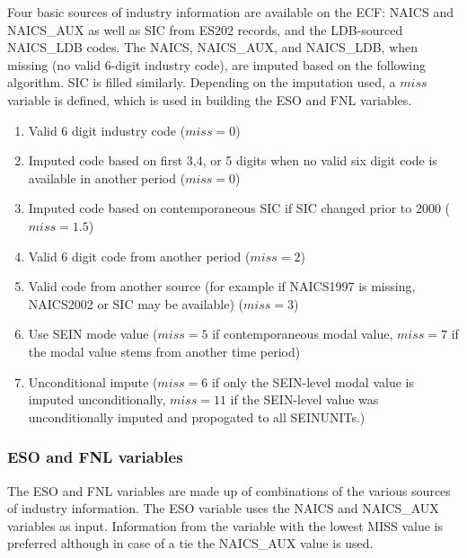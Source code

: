Four basic sources of industry information are available on the ECF: NAICS
and NAICS{\_}AUX as well as SIC from ES202 records, and the LDB-sourced
NAICS{\_}LDB codes. The NAICS, NAICS{\_}AUX, and 
NAICS{\_}LDB, when missing (no valid 6-digit industry code), are imputed based on the  following
algorithm. SIC is filled similarly. Depending on the imputation used, a
$miss$ variable is defined, which is used in building the ESO and FNL variables.


\begin{enumerate}
\item Valid 6 digit industry code ($miss=0$)

\item Imputed code based on first 3,4, or 5 digits when no valid six digit code is 
available in another period ($miss=0$)

\item Imputed code based on contemporaneous SIC if SIC changed prior to 2000 
($miss=1.5$)

\item Valid 6 digit code from another period ($miss=2$)

\item Valid code from another source (for example if NAICS1997 is missing, 
NAICS2002 or SIC may be available) ($miss=3$)

\item Use SEIN mode value ($miss=5$ if contemporaneous modal value, $miss=7$ if
  the modal value stems from another time period)

\item Unconditional impute ($miss=6$ if only the SEIN-level modal value is
  imputed unconditionally, $miss=11$ if the SEIN-level value was
  unconditionally imputed and propogated to all SEINUNITs.)
\end{enumerate}



\subsubsection{ESO and FNL variables}



The ESO and FNL variables are made up of combinations of the various sources 
of industry information. The ESO variable uses the NAICS and NAICS{\_}AUX 
variables as input. Information from the variable with the lowest MISS value 
is preferred although in case of a tie the NAICS{\_}AUX value is used.


